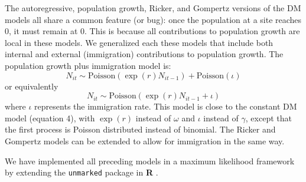 \documentclass[12pt]{article}
\begin{document}
The autoregressive, population growth, Ricker, and Gompertz
versions of the DM models all share a common feature (or bug):
once the population at a site reaches 0, it must remain at 0.
This is because all contributions to population growth are
local in these models.  We generalized each these models that
include both internal and external (immigration) contributions
to population growth.  The population growth plus immigration
model is:
\begin{equation}
  N_{it} \sim \text{Poisson}(\exp(r)N_{it-1}) + \text{Poisson}(\iota)
  \label{eq:expimm1}
\end{equation}
or equivalently
\begin{equation}
  N_{it} \sim \text{Poisson}(\exp(r)N_{it-1} + \iota)
  \label{eq:expimm2}
\end{equation}
where $\iota$ represents the immigration rate.  This model is close to
the constant DM model (equation 4), with $\exp(r)$ instead of $\omega$
and $\iota$ instead of $\gamma$, except that the first
process is Poisson distributed instead of binomial. The Ricker and
Gompertz models can be extended to allow for immigration in the same
way.

We have implemented all preceding models in
a maximum likelihood framework by extending the \texttt{unmarked} package
\citep{fiske_chandler:2011} in \textbf{R} \citep{R-2012}.
\end{document}
